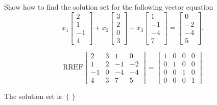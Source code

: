 
\begin{exerciseStatement}


Show how to find the solution set for the following vector equation \[ x_{1} \left[\begin{array}{c}
2 \\
1 \\
-1 \\
4
\end{array}\right] + x_{2} \left[\begin{array}{c}
3 \\
2 \\
0 \\
3
\end{array}\right] + x_{3} \left[\begin{array}{c}
1 \\
-1 \\
-4 \\
7
\end{array}\right] = \left[\begin{array}{c}
0 \\
-2 \\
-4 \\
5
\end{array}\right] .\]


\end{exerciseStatement}
    
\begin{exerciseAnswer} 
\[\mathrm{RREF} \left[\begin{array}{ccc|c}
2 & 3 & 1 & 0 \\
1 & 2 & -1 & -2 \\
-1 & 0 & -4 & -4 \\
4 & 3 & 7 & 5
\end{array}\right]  =  \left[\begin{array}{ccc|c}
1 & 0 & 0 & 0 \\
0 & 1 & 0 & 0 \\
0 & 0 & 1 & 0 \\
0 & 0 & 0 & 1
\end{array}\right] \]

The solution set is \( \left\{\right\} \)


\end{exerciseAnswer}
    
